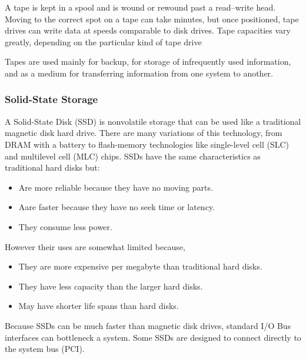 A tape is kept in a spool and is wound or rewound past a read–write head.
Moving to the correct spot on a tape can take minutes, but once positioned, tape drives can write data at speeds comparable to disk drives.
Tape capacities vary greatly, depending on the particular kind of tape drive

Tapes are used mainly for backup, for storage of infrequently used information, and as a medium for transferring information from one system to another.

\subsubsection{Solid-State Storage}\label{subsubsec:Solid_State_Storage}
A Solid-State Disk (SSD) is nonvolatile storage that can be used like a traditional magnetic disk hard drive.
There are many variations of this technology, from DRAM with a battery to flash-memory technologies like single-level cell (SLC) and multilevel cell (MLC) chips.
SSDs have the same characteristics as traditional hard disks but:
\begin{itemize}[noitemsep]
\item Are more reliable because they have no moving parts.
\item Aare faster because they have no seek time or latency.
\item They consume less power.
\end{itemize}

However their uses are somewhat limited because,
\begin{itemize}[noitemsep]
\item They are more expensive per megabyte than traditional hard disks.
\item They have less capacity than the larger hard disks.
\item May have shorter life spans than hard disks.
\end{itemize}

Because SSDs can be much faster than magnetic disk drives, standard I/O Bus interfaces can bottleneck a system.
Some SSDs are designed to connect directly to the system bus (PCI).


